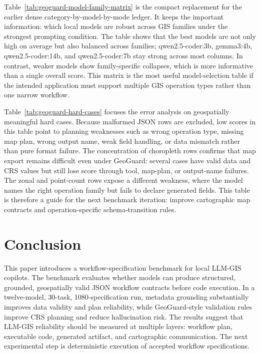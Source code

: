 \documentclass[]{interact}
\begin{document}
Table~\ref{tab:geoguard-model-family-matrix} is the compact replacement for the earlier dense category-by-model-by-mode ledger. It keeps the important information: which local models are robust across GIS families under the strongest prompting condition. The table shows that the best models are not only high on average but also balanced across families; qwen2.5-coder:3b, gemma3:4b, qwen2.5-coder:14b, and qwen2.5-coder:7b stay strong across most columns. In contrast, weaker models show family-specific collapses, which is more informative than a single overall score. This matrix is the most useful model-selection table if the intended application must support multiple GIS operation types rather than one narrow workflow.



Table~\ref{tab:geoguard-hard-cases} focuses the error analysis on geospatially meaningful hard cases. Because malformed JSON rows are excluded, low scores in this table point to planning weaknesses such as wrong operation type, missing map plan, wrong output name, weak field handling, or data mismatch rather than pure format failure. The concentration of choropleth rows confirms that map export remains difficult even under GeoGuard: several cases have valid data and CRS values but still lose score through tool, map-plan, or output-name failures. The zonal and point-count rows expose a different weakness, where the model names the right operation family but fails to declare generated fields. This table is therefore a guide for the next benchmark iteration: improve cartographic map contracts and operation-specific schema-transition rules.

\clearpage
\section{Conclusion}

This paper introduces a workflow-specification benchmark for local LLM-GIS copilots. The benchmark evaluates whether models can produce structured, grounded, geospatially valid JSON workflow contracts before code execution. In a twelve-model, 30-task, 1080-specification run, metadata grounding substantially improves data validity and plan reliability, while GeoGuard-style validation rules improve CRS planning and reduce hallucination risk. The results suggest that LLM-GIS reliability should be measured at multiple layers: workflow plan, executable code, generated artifact, and cartographic communication. The next experimental step is deterministic execution of accepted workflow specifications.
\end{document}

